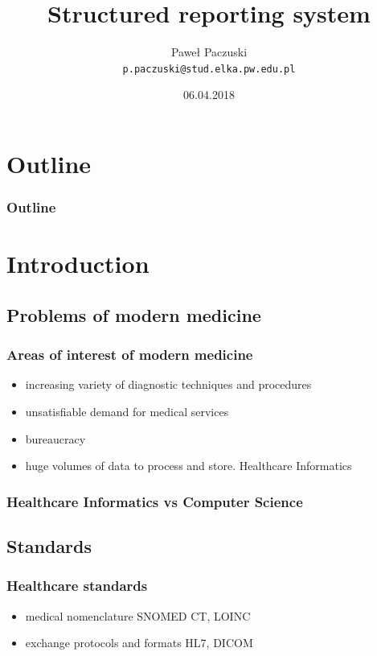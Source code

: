 \documentclass{beamer}
\author{Paweł Paczuski\\ \texttt{p.paczuski@stud.elka.pw.edu.pl}}
\title{Structured reporting system}
\date{06.04.2018}
\begin{document}
\begin{frame}
\titlepage
\end{frame}

\section*{Outline}
\begin{frame}
\frametitle{Outline}
\tableofcontents
\end{frame}

\section{Introduction}
\subsection{Problems of modern medicine}
\begin{frame}
\frametitle{Areas of interest of modern medicine}
\begin{itemize}
	\item increasing variety of diagnostic techniques and procedures
	\item unsatisfiable demand for medical services
	\item bureaucracy
	\item huge volumes of data to process and store. \alert{Healthcare Informatics}
\end{itemize}
\end{frame}

\begin{frame}
\frametitle{Healthcare Informatics vs Computer Science}
\end{frame}

\subsection{Standards}
\begin{frame}
\frametitle{Healthcare standards}
\begin{itemize}
	\item medical nomenclature SNOMED CT, LOINC
	\item exchange protocols and formats HL7, DICOM
\end{itemize}
\end{frame}
\end{document}
